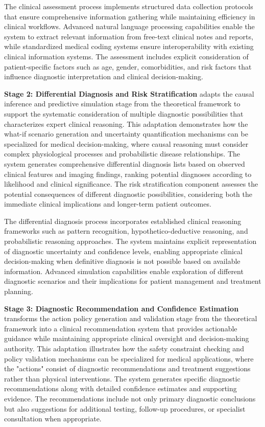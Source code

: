 The clinical assessment process implements structured data collection protocols that ensure comprehensive information gathering while maintaining efficiency in clinical workflows. Advanced natural language processing capabilities enable the system to extract relevant information from free-text clinical notes and reports, while standardized medical coding systems ensure interoperability with existing clinical information systems. The assessment includes explicit consideration of patient-specific factors such as age, gender, comorbidities, and risk factors that influence diagnostic interpretation and clinical decision-making.

\textbf{Stage 2: Differential Diagnosis and Risk Stratification} adapts the causal inference and predictive simulation stage from the theoretical framework to support the systematic consideration of multiple diagnostic possibilities that characterizes expert clinical reasoning. This adaptation demonstrates how the what-if scenario generation and uncertainty quantification mechanisms can be specialized for medical decision-making, where causal reasoning must consider complex physiological processes and probabilistic disease relationships. The system generates comprehensive differential diagnosis lists based on observed clinical features and imaging findings, ranking potential diagnoses according to likelihood and clinical significance. The risk stratification component assesses the potential consequences of different diagnostic possibilities, considering both the immediate clinical implications and longer-term patient outcomes.

The differential diagnosis process incorporates established clinical reasoning frameworks such as pattern recognition, hypothetico-deductive reasoning, and probabilistic reasoning approaches. The system maintains explicit representation of diagnostic uncertainty and confidence levels, enabling appropriate clinical decision-making when definitive diagnosis is not possible based on available information. Advanced simulation capabilities enable exploration of different diagnostic scenarios and their implications for patient management and treatment planning.

\textbf{Stage 3: Diagnostic Recommendation and Confidence Estimation} transforms the action policy generation and validation stage from the theoretical framework into a clinical recommendation system that provides actionable guidance while maintaining appropriate clinical oversight and decision-making authority. This adaptation illustrates how the safety constraint checking and policy validation mechanisms can be specialized for medical applications, where the "actions" consist of diagnostic recommendations and treatment suggestions rather than physical interventions. The system generates specific diagnostic recommendations along with detailed confidence estimates and supporting evidence. The recommendations include not only primary diagnostic conclusions but also suggestions for additional testing, follow-up procedures, or specialist consultation when appropriate.

